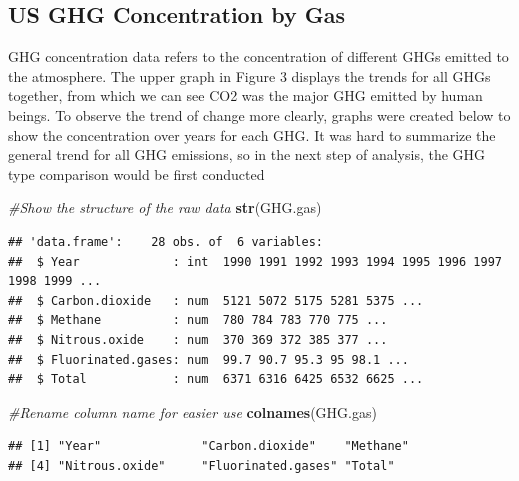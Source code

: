 \documentclass[12pt,]{article}
\newenvironment{Shaded}{\begin{snugshade}}{\end{snugshade}}
\newcommand{\KeywordTok}[1]{\textcolor[rgb]{0.13,0.29,0.53}{\textbf{#1}}}
\newcommand{\StringTok}[1]{\textcolor[rgb]{0.31,0.60,0.02}{#1}}
\newcommand{\CommentTok}[1]{\textcolor[rgb]{0.56,0.35,0.01}{\textit{#1}}}
\newcommand{\OperatorTok}[1]{\textcolor[rgb]{0.81,0.36,0.00}{\textbf{#1}}}
\newcommand{\NormalTok}[1]{#1}
\begin{document}
\newpage

\subsection{US GHG Concentration by
Gas}\label{us-ghg-concentration-by-gas}

GHG concentration data refers to the concentration of different GHGs
emitted to the atmosphere. The upper graph in Figure 3 displays the
trends for all GHGs together, from which we can see CO2 was the major
GHG emitted by human beings. To observe the trend of change more
clearly, graphs were created below to show the concentration over years
for each GHG. It was hard to summarize the general trend for all GHG
emissions, so in the next step of analysis, the GHG type comparison
would be first conducted

\begin{Shaded}
\begin{Highlighting}[]
\CommentTok{#Show the structure of the raw data}
\KeywordTok{str}\NormalTok{(GHG.gas)}
\end{Highlighting}
\end{Shaded}

\begin{verbatim}
## 'data.frame':    28 obs. of  6 variables:
##  $ Year             : int  1990 1991 1992 1993 1994 1995 1996 1997 1998 1999 ...
##  $ Carbon.dioxide   : num  5121 5072 5175 5281 5375 ...
##  $ Methane          : num  780 784 783 770 775 ...
##  $ Nitrous.oxide    : num  370 369 372 385 377 ...
##  $ Fluorinated.gases: num  99.7 90.7 95.3 95 98.1 ...
##  $ Total            : num  6371 6316 6425 6532 6625 ...
\end{verbatim}

\begin{Shaded}
\begin{Highlighting}[]
\CommentTok{#Rename column name for easier use}
\KeywordTok{colnames}\NormalTok{(GHG.gas)}
\end{Highlighting}
\end{Shaded}

\begin{verbatim}
## [1] "Year"              "Carbon.dioxide"    "Methane"          
## [4] "Nitrous.oxide"     "Fluorinated.gases" "Total"
\end{verbatim}

\begin{Shaded}
\end{Shaded}
\end{document}
